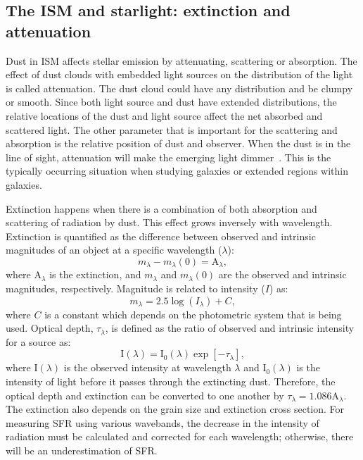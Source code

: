 \subsection{The ISM and starlight: extinction and attenuation}
\label{sec: extinction}
Dust in ISM affects stellar emission by attenuating, scattering or absorption.
The effect of dust clouds with embedded light sources on the distribution of the light is called attenuation. 
The dust cloud could have any distribution and be clumpy or smooth. 
Since both light source and dust have extended distributions, the relative locations of the dust and light source affect the net absorbed and scattered light.
The other parameter that is important for the scattering and absorption is the relative position of dust and observer.
When the dust is in the line of sight, attenuation will make the emerging light dimmer~\citep[e.g.][and references therein]{Calzetti13}.
This is the typically occurring situation when studying galaxies or extended regions within galaxies.

Extinction happens when there is a combination of both absorption and scattering of radiation by dust.
This effect grows inversely with wavelength.
Extinction is quantified as the difference between observed and intrinsic magnitudes of an object at a specific wavelength ($\lambda$):
\begin{equation}
m_{\lambda} - m_{\lambda}(0) = \mathrm{A}_{\lambda},
\end{equation}
where $\mathrm{A}_{\lambda}$ is the extinction, and $m_{\lambda}$ and $m_{\lambda}(0)$ are the observed and intrinsic magnitudes, respectively.
Magnitude is related to intensity ($I$) as:
\begin{equation}
m_{\lambda} = 2.5 \log (I_{\lambda}) + C,
\end{equation}
where $C$ is a constant which depends on the photometric system that is being used.
Optical depth, $\tau_{\lambda}$, is defined as the ratio of observed and intrinsic intensity for a source as:
\begin{equation}
\label{equ: extinction}
{\mathrm I}(\lambda) = {\mathrm I}_0(\lambda)\exp[-\tau_{\lambda}],
\end{equation}
where I$(\lambda)$ is the observed intensity at wavelength $\lambda$ and I$_0(\lambda)$ is the intensity of light before it passes through the extincting dust.
Therefore, the optical depth and extinction can be converted to one another by $\tau_{\lambda} = 1.086 \mathrm{A}_{\lambda}$. 
The extinction also depends on the grain size and extinction cross section.
For measuring SFR using various wavebands, the decrease in the intensity of radiation must be calculated and corrected for each wavelength; otherwise, there will be an underestimation of SFR. 

